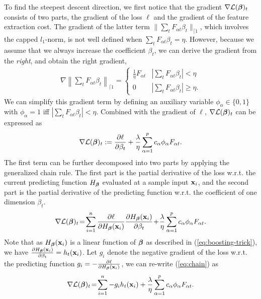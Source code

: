 To find the steepest descent direction, we first notice that the gradient $\nabla{\cal L}(\boldsymbol{\beta})_{t}$ consists of two parts, the gradient of the loss $\ell$ and the gradient of the feature extraction cost. The gradient of the latter term $\|\sum_t F_{\alpha t}\beta_t\|_{\lceil 1}$, which involves the capped $l_1$-norm, is not well defined when $\sum_t F_{\alpha t}\beta_t = \eta$. However, because we assume that we always increase the coefficient $\beta_t$, we can derive the gradient from the \emph{right}, and obtain the right gradient,
\begin{align}
	\nabla \left\|\sum_t F_{\alpha t} \beta_t\right\|_{\lceil 1} = \left \{ \begin{array}{cl}
	\frac{1}{\eta}F_{\alpha t} & |\sum_t F_{\alpha t} \beta_t| < \eta \\
	0 & |\sum_t F_{\alpha t} \beta_t| \ge \eta.  \label{eq:omega}
	\end{array} \right. 	
\end{align}
We can simplify this gradient term by defining an auxiliary variable $\phi_\alpha \in \{0,1\}$ with $\phi_\alpha = 1$ iff $ |\sum_t F_{\alpha t} \beta_t| < \eta$. Combined with the gradient of $\ell$, $\nabla{\cal L}(\boldsymbol{\beta})_{t}$ can be expressed as
\begin{align}
\nabla {\cal L}(\boldsymbol{\beta})_t:= \frac{\partial \ell}{\partial \beta_t} + \frac{\lambda}{\eta} \sum_{\alpha=1}^p c_{\alpha} \phi_{\alpha} F_{\alpha t}. \label{eq:gradient}
\end{align} 
The first term can be further decomposed into two parts by applying the generalized chain rule. The first part is the partial derivative of the loss w.r.t. the current predicting function $H_{\boldsymbol{\beta}}$ evaluated at a sample input $\mathbf{x}_i$, and the second part is the partial derivative of the predicting function w.r.t. the coefficient of one dimension $\beta_t$. 
\begin{align}				
	\nabla{\cal L}(\boldsymbol{\beta})_t\!=\! \displaystyle\sum_{i=1}^n \frac{\partial \ell}{\partial H_{\boldsymbol{\beta}}(\mathbf{x}_i)} \frac{\partial H_{\boldsymbol{\beta}}(\mathbf{x}_i)}{\partial \beta_{t}} \!+\! \frac{\lambda}{\eta} \sum_{\alpha=1}^p c_{\alpha} \phi_{\alpha} F_{\alpha t}. \label{eq:chain} 
\end{align}
Note that as $H_{\boldsymbol{\beta}}(\mathbf{x}_i)$ is a linear function of $\boldsymbol{\beta}$ as described in (\ref{eq:boosting-trick}), we have $\frac{\partial H_{\boldsymbol{\beta}}(\mathbf{x}_i)}{\partial \beta_{t}} = h_t(\mathbf{x}_i)$. Let $g_i$ denote the negative gradient of the loss w.r.t. the predicting function $g_i = -\frac{\partial \ell}{\partial H_{\boldsymbol{\beta}}(\mathbf{x}_i)}$, we can re-write (\ref{eq:chain}) as
\begin{align}			
	\nabla{\cal L}(\boldsymbol{\beta})_t\!=\! \displaystyle\sum_{i=1}^n -g_i h_t(\mathbf{x}_i) + \frac{\lambda}{\eta} \sum_{\alpha=1}^p c_{\alpha} \phi_{\alpha} F_{\alpha t}. \label{eq:ghf} 
\end{align} 
